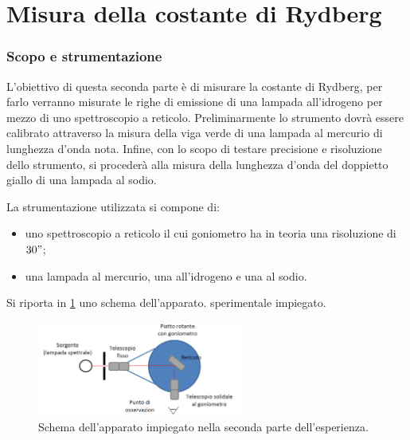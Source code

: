 \part{Misura della costante di Rydberg}
\section{Scopo e strumentazione}
	L'obiettivo di questa seconda parte è di misurare la costante di Rydberg, per farlo verranno misurate le righe di emissione di una lampada all'idrogeno per mezzo di uno spettroscopio a reticolo. Preliminarmente lo strumento dovrà essere calibrato attraverso la misura della viga verde di una lampada al mercurio di lunghezza d'onda nota.
	Infine, con lo scopo di testare precisione e risoluzione dello strumento, si procederà alla misura della lunghezza d'onda del doppietto giallo di una lampada al sodio.

La strumentazione utilizzata si compone di:
\begin{itemize}
	\item uno spettroscopio a reticolo il cui goniometro ha in teoria una risoluzione di $30"$;
	\item una lampada al mercurio, una all'idrogeno e una al sodio.
\end{itemize}

Si riporta in \figurename{ \ref{fig:reticolo}} uno schema dell'apparato.
sperimentale impiegato. 
\begin{figure} [H]
	\centering
	\includegraphics[width=0.6\textwidth]{../Figs-tabs/reticolo.png}
	\caption{Schema dell'apparato impiegato nella seconda parte dell'esperienza.}
	\label{fig:reticolo}
\end{figure}
